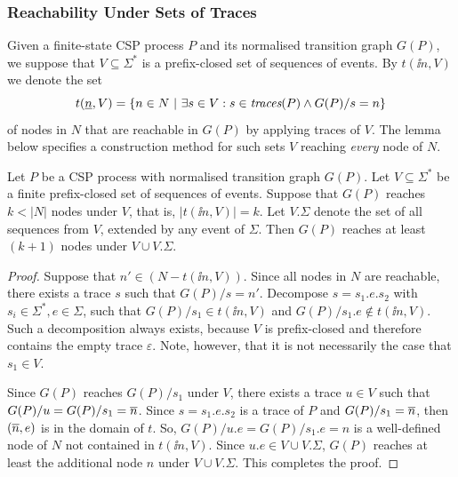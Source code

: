 \subsubsection*{Reachability Under Sets of Traces}
\label{sec:V} Given a finite-state CSP process $P$ and its normalised
transition graph $G(P)$,
we suppose that $V\subseteq\Sigma^*$ is a prefix-closed set  of sequences of
events. By $t(\ii n,V)$ we denote the set
\[
t(\underline{n},V) = \{ n\in N~|~\exists s\in V: s\in\text{\it traces}(P)\wedge G(P)/s = n \}
\]
of nodes in $N$ that are reachable in $G(P)$ by applying traces of $V$. The
lemma below specifies a construction method for such sets $V$ reaching {\it
every} node of $N$.

\begin{lemma}
\label{lemma:extendV} Let $P$ be a CSP process with normalised transition
graph $G(P)$. %
Let
$V\subseteq\Sigma^*$ be a finite prefix-closed set of sequences of events.
Suppose that  $G(P)$ reaches $k < |N|$ nodes under $V$, that is, $|t(\ii
n,V)| = k$. Let $V.\Sigma$ denote the set of all sequences from $V$, extended
by any event of $\Sigma$. Then $G(P)$ reaches at least $(k+1)$ nodes under
$V\cup V.\Sigma$.
\end{lemma}
\begin{proof}
Suppose that $n'\in (N - t(\ii n,V))$.  Since all nodes in $N$ are reachable,
there exists a trace $s$ such that $G(P)/s = n'$. Decompose $s = s_1.e.s_2$
with $s_i\in\Sigma^*, e\in\Sigma$, such that $G(P)/s_1 \in t(\ii n,V)$ and
$G(P)/s_1.e \not\in t(\ii n,V)$. Such a decomposition always exists, because
$V$ is prefix-closed and therefore contains the empty trace $\varepsilon$.
Note, however, that it is not necessarily the case that $s_1\in V$.

Since $G(P)$ reaches $G(P)/s_1$ under $V$, there exists a trace $u\in V$ such
that $G(P)/u = G(P)/s_1 = \overline n$. Since $s = s_1.e.s_2$ is a trace of $P$ and
$G(P)/s_1 = \overline n$, then $(\overline n,e)$ is in the domain of $t$. So, $ G(P)/u.e
= G(P)/s_1.e = n$ is a well-defined node of $N$ not contained in $t(\ii
n,V)$. Since $u.e\in V\cup V.\Sigma$, $G(P)$ reaches at least the additional
node $n$ under $V\cup V.\Sigma$. This completes the proof. \xbox
\end{proof}

